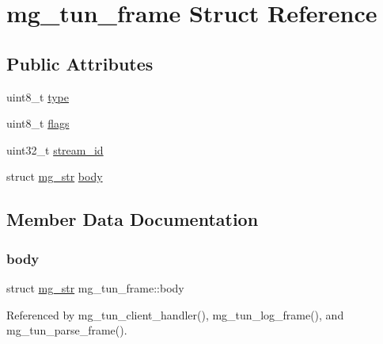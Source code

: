 \hypertarget{structmg__tun__frame}{}\section{mg\+\_\+tun\+\_\+frame Struct Reference}
\label{structmg__tun__frame}
\subsection*{Public Attributes}
\begin{DoxyCompactItemize}
\item 
uint8\+\_\+t \hyperlink{structmg__tun__frame_a7b0c01ce546ee5b25b7910958e0acde1_a7b0c01ce546ee5b25b7910958e0acde1}{type}
\item 
uint8\+\_\+t \hyperlink{structmg__tun__frame_a17f3753158bd1dc19cd47658dcd8a647_a17f3753158bd1dc19cd47658dcd8a647}{flags}
\item 
uint32\+\_\+t \hyperlink{structmg__tun__frame_a01db02c8e303dd90887b38efb8444b2b_a01db02c8e303dd90887b38efb8444b2b}{stream\+\_\+id}
\item 
struct \hyperlink{structmg__str}{mg\+\_\+str} \hyperlink{structmg__tun__frame_adcc6a8085ba62eaa3d5b646a183d1418_adcc6a8085ba62eaa3d5b646a183d1418}{body}
\end{DoxyCompactItemize}


\subsection{Member Data Documentation}
\mbox{\label{structmg__tun__frame_adcc6a8085ba62eaa3d5b646a183d1418_adcc6a8085ba62eaa3d5b646a183d1418}} 
\subsubsection{\texorpdfstring{body}{body}}
{\footnotesize\ttfamily struct \hyperlink{structmg__str}{mg\+\_\+str} mg\+\_\+tun\+\_\+frame\+::body}



Referenced by mg\+\_\+tun\+\_\+client\+\_\+handler(), mg\+\_\+tun\+\_\+log\+\_\+frame(), and mg\+\_\+tun\+\_\+parse\+\_\+frame().

\mbox{\label{structmg__tun__frame_a17f3753158bd1dc19cd47658dcd8a647_a17f3753158bd1dc19cd47658dcd8a647}} 

